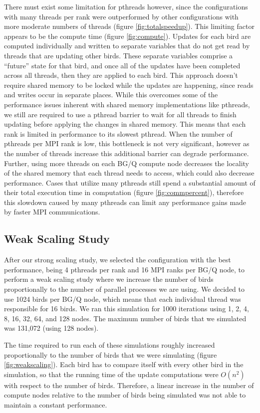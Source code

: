 There must exist some limitation for pthreads however, since the configurations
with many threads per rank were outperformed by other configurations with more
moderate numbers of threads (figure \ref{fig:totalspeedup}). This limiting factor
appears to be the compute time (figure \ref{fig:compute}). Updates for each
bird are computed individually and written to separate variables that do not
get read by threads that are updating other birds. These separate variables
comprise a ``future'' state for that bird, and once all of the updates have
been completed across all threads, then they are applied to each bird. This
approach doesn't require shared memory to be locked while the updates are happening,
since reads and writes occur in separate places. While this overcomes some of the
performance issues inherent with shared memory implementations like pthreads, we
still are required to use a pthread barrier to wait for all threads to finish
updating before applying the changes in shared memory. This means that each rank
is limited in performance to its slowest pthread. When the number of pthreads per
MPI rank is low, this bottleneck is not very significant, however as the number
of threads increase this additional barrier can degrade performance. Further,
using more threads on each BG/Q compute node decreases the locality of the shared
memory that each thread needs to access, which could also decrease performance.
Cases that utilize many pthreads still spend a substantial amount of their total
execution time in computation (figure \ref{fig:commpercent}), therefore this
slowdown caused by many pthreads can limit any performance gains made by faster
MPI communications.

\subsection*{Weak Scaling Study}

After our strong scaling study, we selected the configuration with the best
performance, being 4 pthreads per rank and 16 MPI ranks per BG/Q node, to
perform a weak scaling study where we increase the number of birds proportionally
to the number of parallel processes we are using. We decided to use 1024 birds
per BG/Q node, which means that each individual thread was responsible for 16
birds. We ran this simulation for 1000 iterations using 1, 2, 4, 8, 16, 32, 64,
and 128 nodes. The maximum number of birds that we simulated was 131,072 (using
128 nodes).

The time required to run each of these simulations roughly increased proportionally
to the number of birds that we were simulating (figure \ref{fig:weakscaling}).
Each bird has to compare itself with every other bird in the simulation, so that
the running time of the update computations were \(O(n^2)\) with respect to the
number of birds. Therefore, a linear increase in the number of compute nodes
relative to the number of birds being simulated was not able to maintain a
constant performance.

